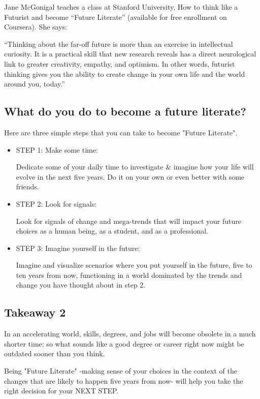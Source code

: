 \documentclass[11pt]{book} %
\begin{document}
		Jane McGonigal teaches a class at Stanford University, How to think like a Futurist and become “Future Literate” (available for free enrollment on Coursera). She says:
		
		“Thinking about the far-off future is more than an exercise in intellectual curiosity. It is a practical skill that new research reveals has a direct neurological link to greater creativity, empathy, and optimism. In other words, futurist thinking gives you the ability to create change in your own life and the world around you, today.”  
		
	\subsection{ What do you do to become a future literate?}
		Here are three simple steps that you can take to become "Future Literate".
		\begin{itemize}
			\item STEP 1:  Make some time:

				Dedicate some of your daily time to investigate \& imagine how your life will evolve in the next five years. Do it on your own or even better with some friends. 

			\item STEP 2:  Look for signals:
			
				Look for signals of change and mega-trends that will impact your future choices as a human being, as a student, and as a professional.

			\item STEP 3:  Imagine yourself in the future:

				Imagine and visualize scenarios where you put yourself in the future, five to ten years from now, functioning in a world dominated by the trends and change you have thought about in step 2.
		\end{itemize}		
				
	\subsection{Takeaway 2}
		In an accelerating world, skills, degrees, and jobs will become obsolete in a much shorter time: so what sounds like a good degree or career right now might be outdated sooner than you think. 
		
		Being "Future Literate" -making sense of your choices in the context of the changes that are likely to happen five years from now- will help you take the right decision for your NEXT STEP.
		
\end{document}
